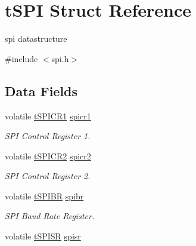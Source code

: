 \hypertarget{structt_s_p_i}{}\section{t\+S\+P\+I Struct Reference}
\label{structt_s_p_i}


spi datastructure  




{\ttfamily \#include $<$spi.\+h$>$}

\subsection*{Data Fields}
\begin{DoxyCompactItemize}
\item 
\hypertarget{structt_s_p_i_a492a97a82d3dd14a73f9003730a99c4e}{}volatile \hyperlink{unionu_s_p_i_c_r1}{t\+S\+P\+I\+C\+R1} \hyperlink{structt_s_p_i_a492a97a82d3dd14a73f9003730a99c4e}{spicr1}\label{structt_s_p_i_a492a97a82d3dd14a73f9003730a99c4e}

\begin{DoxyCompactList}\small\item\em S\+P\+I Control Register 1. \end{DoxyCompactList}\item 
\hypertarget{structt_s_p_i_affea86bd9819c3508875e42a6163f3a4}{}volatile \hyperlink{unionu_s_p_i_c_r2}{t\+S\+P\+I\+C\+R2} \hyperlink{structt_s_p_i_affea86bd9819c3508875e42a6163f3a4}{spicr2}\label{structt_s_p_i_affea86bd9819c3508875e42a6163f3a4}

\begin{DoxyCompactList}\small\item\em S\+P\+I Control Register 2. \end{DoxyCompactList}\item 
\hypertarget{structt_s_p_i_ad289f2ac822528aeee9727c6bc3f9dd3}{}volatile \hyperlink{unionu_s_p_i_b_r}{t\+S\+P\+I\+B\+R} \hyperlink{structt_s_p_i_ad289f2ac822528aeee9727c6bc3f9dd3}{spibr}\label{structt_s_p_i_ad289f2ac822528aeee9727c6bc3f9dd3}

\begin{DoxyCompactList}\small\item\em S\+P\+I Baud Rate Register. \end{DoxyCompactList}\item 
\hypertarget{structt_s_p_i_ac7e78b5b755297678cf64740bcddaabd}{}volatile \hyperlink{unionu_s_p_i_s_r}{t\+S\+P\+I\+S\+R} \hyperlink{structt_s_p_i_ac7e78b5b755297678cf64740bcddaabd}{spisr}\label{structt_s_p_i_ac7e78b5b755297678cf64740bcddaabd}


\end{DoxyCompactItemize}
